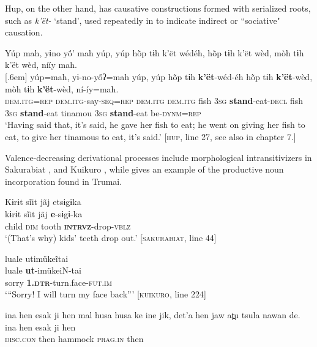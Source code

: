 \documentclass[output=paper,
modfonts,nonflat
]{langsci/langscibook}
\begin{document}
Hup, on the other hand, has causative constructions formed with serialized roots, such as \textit{k'ët-} ‘stand', used repeatedly in  to indicate indirect or “sociative" causation.

\ea\label{ex:intro:17}  Yúp mah, yɨno yö́’ mah yúp, yúp hõ̀p tɨh k’ët wédéh, hõ̀p tɨh k’ët wèd, mòh tɨh k’ët wèd, nííy mah.\\[.3em] [.6em]
\gll yúp=mah, yɨ-no-yö́ʔ=mah yúp, yúp hõ̀p tɨh \textbf{k’ët}-wéd-éh hõ̀p tɨh \textbf{k’ët}-wèd, mòh tɨh \textbf{k’ët}-wèd, ní-íy=mah.\\
     \textsc{dem.itg=rep} \textsc{dem.itg-}say\textsc{-seq=rep} \textsc{dem.itg} \textsc{dem.itg} fish \textsc{3sg} \textbf{stand}-eat\textsc{-decl} fish \textsc{3sg} \textbf{stand}-eat tinamou \textsc{3sg} \textbf{stand}-eat be\textsc{-dynm=rep}\\
\glt ‘Having said that, it’s said, he gave her fish to eat; he went on giving her fish to eat, to give her tinamous to eat, it’s said.'  [\textsc{hup}, line 27, see also  in chapter 7.]
\z

Valence-decreasing derivational processes include morphological intransi\-tiv\-iz\-ers in Sakurabiat , and Kuikuro , while  gives an example of the productive noun incorporation found in Trumai. 

\ea\label{ex:intro:18} Kɨrɨt sĩit jãj etsɨgɨka\\[.3em]
\gll kɨrɨt sĩit jãj \textbf{e}-sɨgɨ-ka\\
     child \textsc{dim} tooth \textbf{\textsc{intrvz}}-drop-\textsc{vblz}\\
\glt ‘(That's why) kids' teeth drop out.’ [\textsc{sakurabiat}, line 44]
\z

\ea\label{ex:intro:19} luale utimükeĩtai \\[.3em]
\gll luale \textbf{ut}-imükeiN-tai \\
sorry \textbf{\textsc{1.dtr}}-turn.face-\textsc{fut.im} \\
\glt ‘“Sorry! I will turn my face back”’ [\textsc{kuikuro}, line 224]\\
\z

\ea\label{ex:intro:20} ina hen esak ji hen mal husa husa ke ine jik, det'a hen jaw at̪u tsula nawan de.\\[.3em]
\gll ina           hen     esak  ji   hen\\     
\textsc{disc.con}  then    hammock  \textsc{prag.in}  then\\     
\end{document}
